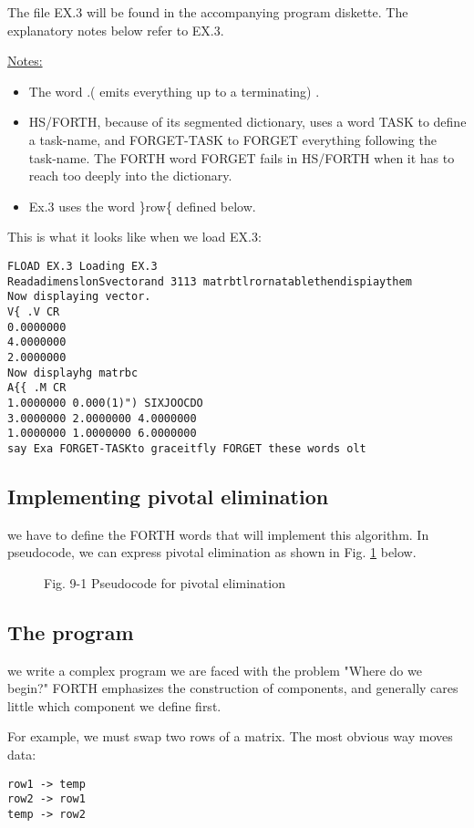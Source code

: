 The file EX.3 will be found in the accompanying program diskette. The explanatory notes below refer to EX.3.

\underline{Notes:}

\begin{itemize}
  \item The word .( emits everything up to a terminating) .
  \item HS/FORTH, because of its segmented dictionary, uses a word TASK to define a task-name, and FORGET-TASK to FORGET everything following the task-name. The FORTH word FORGET fails in HS/FORTH when it has to reach too deeply into the dictionary.
  \item Ex.3 uses the word \}row\{ defined below.
\end{itemize}

This is what it looks like when we load EX.3:

\begin{verbatim}
FLOAD EX.3 Loading EX.3
ReadadimenslonSvectorand 3113 matrbtlrornatablethendispiaythem
Now displaying vector.
V{ .V CR
0.0000000
4.0000000
2.0000000
Now displayhg matrbc
A{{ .M CR
1.0000000 0.000(1)") SIXJOOCDO
3.0000000 2.0000000 4.0000000
1.0000000 1.0000000 6.0000000
say Exa FORGET-TASKto graceitfly FORGET these words olt
\end{verbatim}

\subsection{Implementing pivotal elimination}
 we have to define the FORTH words that will implement
this algorithm. In pseudocode, we can express pivotal elimination as shown in Fig. \ref{fig:09_01} below.

 
\begin{figure}
	\caption{
		Fig. 9-1 Pseudocode for pivotal elimination}
	\label{fig:09_01}
\end{figure}
\subsection{The program}
 we write a complex program we are faced with the
problem "Where do we begin?" FORTH emphasizes the construction of components,
and generally cares little which component
we define first.

For example, we must swap two rows of a matrix. The most
obvious way moves data:

\begin{verbatim}
row1 -> temp
row2 -> row1
temp -> row2
\end{verbatim}

